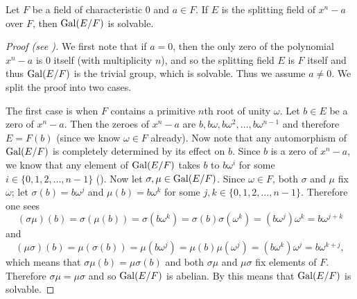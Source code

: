\begin{theorem}\label{thrm-galois-group-of-polynomial-of-nth-root-of-a-is-solvable}
    Let $F$ be a field of characteristic 0 and $a \in F$. If $E$ is the splitting field of $x^n - a$ over $F$, then $\mathrm{Gal}(E/F)$ is solvable.
\end{theorem}
\begin{proof}[Proof (see {\cite[Theorem 32.2]{gallian_2016}})]
    We first note that if $a = 0$, then the only zero of the polynomial $x^n - a$ is 0 itself (with multiplicity $n$), and so the splitting field $E$ is $F$ itself and thus $\mathrm{Gal}(E/F)$ is the trivial group, which is solvable. Thus we assume $a \neq 0$. We split the proof into two cases.

    The first case is when $F$ contains a primitive $n$th root of unity $\omega$. Let $b \in E$ be a zero of $x^n - a$. Then the zeroes of $x^n - a$ are $b, b\omega, b\omega^2, \dots, b\omega^{n-1}$ and therefore $E = F(b)$ (since we know $\omega \in F$ already). Now note that any automorphism of $\mathrm{Gal}(E/F)$ is completely determined by its effect on $b$. Since $b$ is a zero of $x^n - a$, we know that any element of $\mathrm{Gal}(E/F)$ takes $b$ to $b\omega^i$ for some $i \in \{0, 1, 2, \dots, n - 1\}$ (). Now let $\sigma, \mu \in \mathrm{Gal}(E/F)$. Since $\omega \in F$, both $\sigma$ and $\mu$ fix $\omega$; let $\sigma(b) = b\omega^j$ and $\mu(b) = b\omega^k$ for some $j, k \in \{0, 1, 2, \dots, n - 1\}$. Therefore one sees
    \[
        (\sigma\mu)(b) = \sigma(\mu(b)) = \sigma(b\omega^k) = \sigma(b)\sigma(\omega^k) = (b\omega^j)\omega^k = b\omega^{j+k}
    \]
    and
    \[
        (\mu\sigma)(b) = \mu(\sigma(b)) = \mu(b\omega^j) = \mu(b)\mu(\omega^j) = (b\omega^k)\omega^j = b\omega^{k+j},
    \]
    which means that $\sigma\mu(b) = \mu\sigma(b)$ and both $\sigma\mu$ and $\mu\sigma$ fix elements of $F$. Therefore $\sigma\mu = \mu\sigma$ and so $\mathrm{Gal}(E/F)$ is abelian. By  this means that $\mathrm{Gal}(E/F)$ is solvable.


\end{proof}
